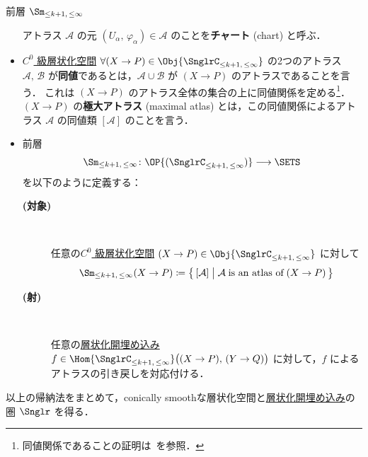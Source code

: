 \documentclass[TQFT_main]{subfiles}
\begin{document}
\begin{mydef}[label=def:Sm-induction,breakable]{前層 $\Sm_{\le k+1,\, \le \infty}$}
\begin{itemize}
\begin{description}
        \end{description}
        アトラス $\mathcal{A}$ の元 $(U_\alpha,\, \varphi_\alpha) \in \mathcal{A}$ のことを\textbf{チャート} (chart) と呼ぶ．

        \item \hyperref[def:Snglr-C0]{$C^0$ 級層状化空間} $\forall (X \to P) \in \Obj{\SnglrC_{\le k+1,\, \le \infty}}$ の2つのアトラス $\mathcal{A},\, \mathcal{B}$ が\textbf{同値}であるとは，$\mathcal{A} \cup \mathcal{B}$ が $(X \to P)$ のアトラスであることを言う．
        これは $(X \to P)$ のアトラス全体の集合の上に同値関係を定める\footnote{同値関係であることの証明は~\cite[Lemma 3.2.11.]{AFT2014stratified}を参照．}．
        $(X \to P)$ の\textbf{極大アトラス} (maximal atlas) とは，この同値関係によるアトラス $\mathcal{A}$ の同値類 $[\mathcal{A}]$ のことを言う．

        \item 前層
        \begin{align}
            \Sm_{\le k+1,\, \le \infty} \colon \OP{(\SnglrC_{\le k+1,\, \le \infty})} \lto \SETS
        \end{align}
        を以下のように定義する：
        \begin{description}
            \item[\textbf{(対象)}]　
            
            任意の\hyperref[def:Snglr-C0]{$C^0$ 級層状化空間} $(X \to P) \in \Obj{\SnglrC_{\le k+1,\, \le \infty}}$ に対して
            \begin{align}
                \Sm_{\le k+1,\, \le \infty} (X \to P) \coloneqq \bigl\{\, [\mathcal{A}] \bigm| \mathcal{A}\; \text{is an atlas of}\; (X \to P) \,\bigr\} 
            \end{align}
            
            \item[\textbf{(射)}]　
            
            任意の\hyperref[def:strat-emb]{層状化開埋め込み} $f \in \Hom{\SnglrC_{\le k+1,\, \le \infty}}\bigl((X \to P),\, (Y \to Q)\bigr)$ に対して，$f$ によるアトラスの引き戻しを対応付ける．
        \end{description}
    \end{itemize}
\end{mydef}

以上の帰納法をまとめて，conically smoothな層状化空間と\hyperref[def:strat-emb]{層状化開埋め込み}の圏 $\Snglr$ を得る．
\end{document}
